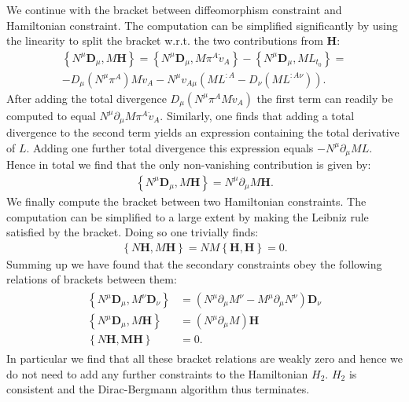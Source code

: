 We continue with the bracket between diffeomorphism constraint and Hamiltonian constraint. The computation can be simplified significantly by using the linearity to split the bracket w.r.t. the two contributions from $\mathbf{H}$: 
\begin{multline}
    \left \{ N^{\mu}\mathbf{D}_{\mu}, M \mathbf{H} \right \} = \left \{ N^\mu \mathbf{D}_\mu , M \pi^A \dot{v}_A   \right \} - \left \{ N^\mu \mathbf{D}_\mu , M L_{t_0}  \right \} = \\
    - D_\mu (N^\mu \pi^A) M \dot{v}_A - N^\mu v_{A\mu} (M L^{:A} - D_\nu (M L^{:A \nu}))  .
\end{multline}
After adding the total divergence $D_{\mu}(N^\mu \pi^A M \dot{v}_A)$ the first term can readily be computed to equal $N^\mu \partial_\mu M \pi^A \dot{v}_A$. Similarly, one finds that adding a total divergence to the second term yields an expression containing the total derivative of $L$. Adding one further total divergence this expression equals $-N^\mu \partial _\mu M L$. Hence in total we find that the only non-vanishing contribution is given by:
\begin{align}
    \left \{ N^{\mu}\mathbf{D}_{\mu}, M \mathbf{H} \right \} = N^\mu \partial_\mu M \mathbf{H}.
\end{align}
We finally compute the bracket between two Hamiltonian constraints. The computation can be simplified to a large extent by making the Leibniz rule satisfied by the bracket. Doing so one trivially finds:
\begin{align}
    \left \{N \mathbf{H}, M \mathbf{H} \right \} = N M \left \{ \mathbf{H}, \mathbf{H}\right \} = 0.
\end{align}
Summing up we have found that the secondary constraints obey the following relations of brackets between them:
\begin{align}
    \begin{aligned}
    \left \{N^\mu \mathbf{D}_\mu, M^\nu \mathbf{D}_\nu \right \} &= (N^\mu \partial_\mu M^\nu - M^\mu \partial _\mu N^\nu)\mathbf{D}_{\nu}\\
    \left \{ N^\mu \mathbf{D}_\mu , M \mathbf{H}\right \} &= (N^\mu \partial_\mu M) \mathbf{H}\\
    \left \{N \mathbf{H , M \mathbf{H}} \right \} &= 0.
    \end{aligned}
\end{align}
In particular we find that all these bracket relations are weakly zero and hence we do not need to add any further constraints to the Hamiltonian $H_2$. $H_2$ is consistent and the Dirac-Bergmann algorithm thus terminates. 

